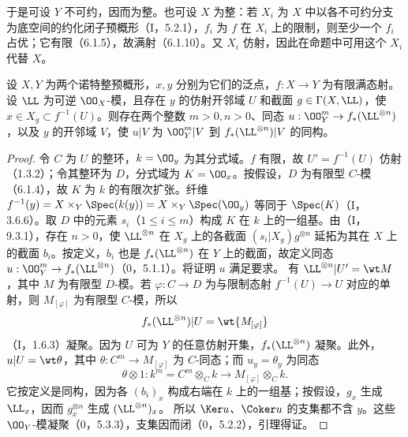 于是可设 $Y$ 不可约，因而为整。也可设 $X$ 为整：若 $X_i$ 为 $X$ 中以各不可约分支为底空间的约化闭子预概形（I，5.2.1），$f_i$ 为 $f$ 在 $X_i$ 上的限制，则至少一个 $f_i$ 占优；它有限（6.1.5），故满射（6.1.10）。又 $X_i$ 仿射，因此在命题中可用这个 $X_i$ 代替 $X$。

设 $X,Y$ 为两个诺特整预概形，$x,y$ 分别为它们的泛点，$f:X\to Y$ 为有限满态射。设 $\LL$ 为可逆 $\OO_X$-模，且存在 $y$ 的仿射开邻域 $U$ 和截面 $g\in\Gamma(X,\LL)$，使 $x\in X_g\subset f^{-1}(U)$。则存在两个整数 $m>0,n>0$、同态
$u:\OO_Y^m\to f_*(\LL^{\otimes n})$，以及 $y$ 的开邻域 $V$，使 $u|V$ 为 $\OO_Y^m|V$ 到 $f_*(\LL^{\otimes n})|V$ 的同构。
\begin{proof}
令 $C$ 为 $U$ 的整环，$k=\OO_y$ 为其分式域。$f$ 有限，故 $U'=f^{-1}(U)$ 仿射（1.3.2）；令其整环为 $D$，分式域为 $K=\OO_x$。按假设，$D$ 为有限型 $C$-模（6.1.4），故 $K$ 为 $k$ 的有限次扩张。纤维
$f^{-1}(y)=X\times_Y\Spec(k(y))=X\times_Y\Spec(\OO_y)$ 等同于 $\Spec(K)$（I，3.6.6）。取 $D$ 中的元素 $s_i$（$1\leq i\leq m$）构成 $K$ 在 $k$ 上的一组基。由（I，9.3.1），存在 $n>0$，使 $\LL^{\otimes n}$ 在 $X_g$ 上的各截面 $(s_i|X_g)g^{\otimes n}$ 延拓为其在 $X$ 上的截面 $b_i$。按定义，$b_i$ 也是 $f_*(\LL^{\otimes n})$ 在 $Y$ 上的截面，故定义同态
$u:\OO_Y^m\to f_*(\LL^{\otimes n})$（0，5.1.1）。将证明 $u$ 满足要求。
有 $\LL^{\otimes n}|U'=\wt M$，其中 $M$ 为有限型 $D$-模。若 $\varphi:C\to D$ 为与限制态射 $f^{-1}(U)\to U$ 对应的单射，则 $M_{[\varphi]}$ 为有限型 $C$-模，所以
\[
f_*(\LL^{\otimes n})|U=\wt{M_{[\varphi]}}
\]
（I，1.6.3）凝聚。因为 $U$ 可为 $Y$ 的任意仿射开集，$f_*(\LL^{\otimes n})$ 凝聚。此外，$u|U=\wt\theta$，其中 $\theta:C^m\to M_{[\varphi]}$ 为 $C$-同态；而 $u_y=\theta_y$ 为同态
\[
\theta\otimes1:k^m=C^m\otimes_C k\longrightarrow M_{[\varphi]}\otimes_C k.
\]
它按定义是同构，因为各 $(b_i)_x$ 构成右端在 $k$ 上的一组基；按假设，$g_x$ 生成 $\LL_x$，因而 $g_x^{\otimes n}$ 生成 $(\LL^{\otimes n})_x$。
所以 $\Ker u$、$\Coker u$ 的支集都不含 $y$。这些 $\OO_Y$-模凝聚（0，5.3.3），支集因而闭（0，5.2.2），引理得证。
\end{proof}

